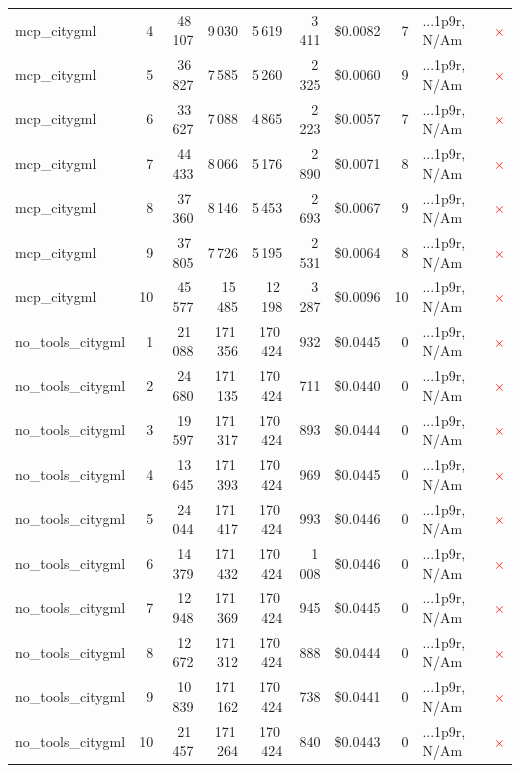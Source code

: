 \documentclass[a4paper,11pt]{article}
\begin{document}
\begin{table}[H]
{\begin{tabular}{l r r r r r r r l c}
mcp\_citygml & 4 & 48\,107 & 9\,030 & 5\,619 & 3\,411 & \$0.0082 & 7 & ...1p9r, N/Am & \textcolor{red}{\(\times\)} \\
mcp\_citygml & 5 & 36\,827 & 7\,585 & 5\,260 & 2\,325 & \$0.0060 & 9 & ...1p9r, N/Am & \textcolor{red}{\(\times\)} \\
mcp\_citygml & 6 & 33\,627 & 7\,088 & 4\,865 & 2\,223 & \$0.0057 & 7 & ...1p9r, N/Am & \textcolor{red}{\(\times\)} \\
mcp\_citygml & 7 & 44\,433 & 8\,066 & 5\,176 & 2\,890 & \$0.0071 & 8 & ...1p9r, N/Am & \textcolor{red}{\(\times\)} \\
mcp\_citygml & 8 & 37\,360 & 8\,146 & 5\,453 & 2\,693 & \$0.0067 & 9 & ...1p9r, N/Am & \textcolor{red}{\(\times\)} \\
mcp\_citygml & 9 & 37\,805 & 7\,726 & 5\,195 & 2\,531 & \$0.0064 & 8 & ...1p9r, N/Am & \textcolor{red}{\(\times\)} \\
mcp\_citygml & 10 & 45\,577 & 15\,485 & 12\,198 & 3\,287 & \$0.0096 & 10 & ...1p9r, N/Am & \textcolor{red}{\(\times\)} \\
\midrule
no\_tools\_citygml & 1 & 21\,088 & 171\,356 & 170\,424 & 932 & \$0.0445 & 0 & ...1p9r, N/Am & \textcolor{red}{\(\times\)} \\
no\_tools\_citygml & 2 & 24\,680 & 171\,135 & 170\,424 & 711 & \$0.0440 & 0 & ...1p9r, N/Am & \textcolor{red}{\(\times\)} \\
no\_tools\_citygml & 3 & 19\,597 & 171\,317 & 170\,424 & 893 & \$0.0444 & 0 & ...1p9r, N/Am & \textcolor{red}{\(\times\)} \\
no\_tools\_citygml & 4 & 13\,645 & 171\,393 & 170\,424 & 969 & \$0.0445 & 0 & ...1p9r, N/Am & \textcolor{red}{\(\times\)} \\
no\_tools\_citygml & 5 & 24\,044 & 171\,417 & 170\,424 & 993 & \$0.0446 & 0 & ...1p9r, N/Am & \textcolor{red}{\(\times\)} \\
no\_tools\_citygml & 6 & 14\,379 & 171\,432 & 170\,424 & 1\,008 & \$0.0446 & 0 & ...1p9r, N/Am & \textcolor{red}{\(\times\)} \\
no\_tools\_citygml & 7 & 12\,948 & 171\,369 & 170\,424 & 945 & \$0.0445 & 0 & ...1p9r, N/Am & \textcolor{red}{\(\times\)} \\
no\_tools\_citygml & 8 & 12\,672 & 171\,312 & 170\,424 & 888 & \$0.0444 & 0 & ...1p9r, N/Am & \textcolor{red}{\(\times\)} \\
no\_tools\_citygml & 9 & 10\,839 & 171\,162 & 170\,424 & 738 & \$0.0441 & 0 & ...1p9r, N/Am & \textcolor{red}{\(\times\)} \\
no\_tools\_citygml & 10 & 21\,457 & 171\,264 & 170\,424 & 840 & \$0.0443 & 0 & ...1p9r, N/Am & \textcolor{red}{\(\times\)} \\
\bottomrule
\end{tabular}}
\end{table}
\end{document}

